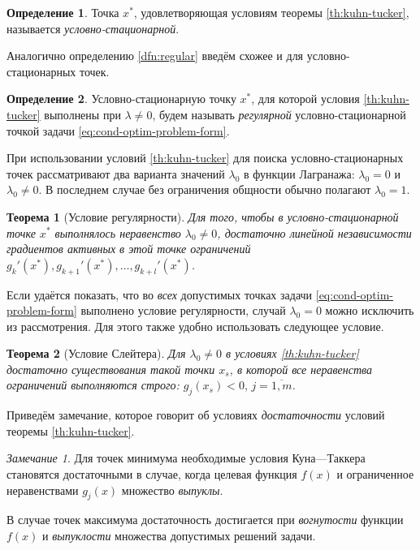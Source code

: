 \documentclass{article}
\newcommand{\neword}{\emph}
\newtheorem{thm}{Теорема}[section]
\theoremstyle{remark}
\newtheorem{rem}{Замечание}[section]
\theoremstyle{definition}
\newtheorem{dfn}{Определение}[section]
\numberwithin{equation}{section}
\begin{document}
\begin{dfn}
  Точка $x^*$, удовлетворяющая условиям теоремы \ref{th:kuhn-tucker},
  называется \neword{условно-стационарной}.
\end{dfn}

Аналогично определению \ref{dfn:regular} введём схожее и для
условно-стационарных точек.
\begin{dfn}
  Условно-стационарную точку $x^*$, для которой условия
  \ref{th:kuhn-tucker} выполнены при $\lambda ≠ 0$, будем называть
  \neword{регулярной} условно-стационарной точкой задачи
  \eqref{eq:cond-optim-problem-form}.
\end{dfn}

При использовании условий \ref{th:kuhn-tucker} для поиска
условно-стационарных точек рассматривают два варианта значений
$\lambda_0$ в функции Лагранажа: $\lambda_0=0$ и $\lambda_0 \neq 0$. В
последнем случае без ограничения общности обычно полагают $\lambda_0 =
1$.

\begin{thm}[Условие регулярности]
  Для того, чтобы в условно-стационарной точке $x^*$ выполнялось
  неравенство $\lambda_0 \neq 0$, достаточно линейной независимости
  градиентов активных в этой точке ограничений $g_k'(x^*),
  g_{k+1}'(x^*), \dotsc, g_{k+l}'(x^*)$.
\end{thm}

Если удаётся показать, что во \emph{всех} допустимых точках задачи
\eqref{eq:cond-optim-problem-form} выполнено условие регулярности,
случай $\lambda_0=0$ можно исключить из рассмотрения. Для этого также
удобно использовать следующее условие.

\begin{thm}[Условие Слейтера]
  \label{th:slater}
  Для $\lambda_0 \neq 0$ в условиях \ref{th:kuhn-tucker} достаточно
  существования такой точки $x_s$, в которой все неравенства
  ограничений выполняются строго: $g_j(x_s)<0, \, j=\overline{1,m}$.
\end{thm}

Приведём замечание, которое говорит об условиях \emph{достаточности}
условий теоремы \ref{th:kuhn-tucker}.

\begin{rem}
  \label{rem:kt-cond}
  Для точек минимума необходимые условия Куна—Таккера становятся
  достаточными в случае, когда целевая функция $f(x)$ и ограниченное
  неравенствами $g_j(x)$ множество \emph{выпуклы}.

  В случае точек максимума достаточность достигается при
  \emph{вогнутости} функции $f(x)$ и \emph{выпуклости} множества
  допустимых решений задачи.
\end{rem}
\end{document}

